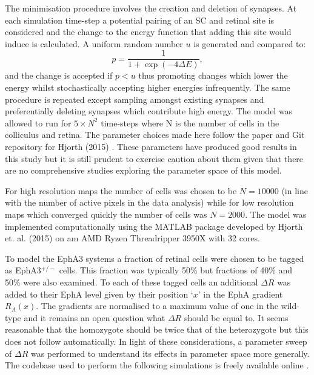 The minimisation procedure involves the creation and deletion of synapses. At each simulation time-step a potential pairing of an SC and retinal site is considered and the change to the energy function that adding this site would induce is calculated. A uniform random number $u$ is generated and compared to:
\begin{equation}
p = \frac{1}{1+\exp(-4\Delta E)},
\end{equation}
and the change is accepted if $p<u$ thus promoting changes which lower the energy whilst stochastically accepting higher energies infrequently. The same procedure is repeated except sampling amongst existing synapses and preferentially deleting synapses which contribute high energy. The model was allowed to run for $5\times N^2$ time-steps where N is the number of cells in the colliculus and retina. The parameter choices made here follow the paper and Git repository for Hjorth (2015) \cite{Hjorth2015-le}. These parameters have produced good results in this study but it is still prudent to exercise caution about them given that there are no comprehensive studies exploring the parameter space of this model.

For high resolution maps the number of cells was chosen to be $N = 10000$ (in line with the number of active pixels in the data analysis) while for low resolution maps which converged quickly the number of cells was $N = 2000$. The model was implemented computationally using the MATLAB package developed by Hjorth et. al. (2015) \cite{Hjorth2015-le} on am AMD Ryzen Threadripper 3950X with 32 cores.

To model the EphA3 systems a fraction of retinal cells were chosen to be tagged as EphA3$^{+/-}$ cells. This fraction was typically 50\% but fractions of 40\% and 50\% were also examined. To each of these tagged cells an additional $\Delta R$ was added to their EphA level given by their position `$x$' in the EphA gradient $R_A(x)$. The gradients are normalised to a maximum value of one in the wild-type and it remains an open question what $\Delta R$ should be equal to. It seems reasonable that the homozygote should be twice that of the heterozygote but this does not follow automatically. In light of these considerations, a parameter sweep of $\Delta R$ was performed to understand its effects in parameter space more generally. The codebase used to perform the following simulations is freely available online \cite{LatticeEphA3}.
\newpage
